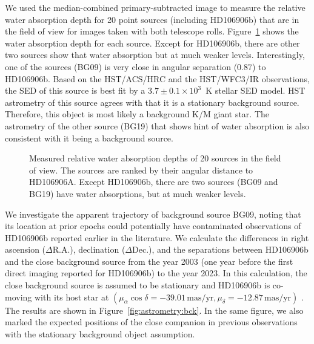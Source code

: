 \documentclass[twocolumn]{aastex62}
\begin{document}
We used the median-combined primary-subtracted image to measure the relative water absorption depth for 20 point sources (including HD106906b) that are in the field of view for images taken with both telescope rolls. Figure~\ref{fig:backgroundsources} shows the water absorption depth for each source. Except for HD106906b, there are other two sources show that water absorption but at much weaker levels. Interestingly, one of the sources (BG09) {is very close in angular separation} (0.87\arcsec) to HD106906b.  Based on the HST/ACS/HRC and the HST/WFC3/IR observations, the SED of this source is best fit by a $3.7\pm0.1\times10^{3}$~K stellar SED model. HST astrometry of this source agrees with  that it is a stationary background source. Therefore, this object is most likely a background K/M giant star. The astrometry of the other source (BG19) that shows hint of water absorption is also consistent with it being a background source.

\begin{figure}
  \centering
  \caption{Measured relative water absorption depths of 20 sources in the field of view. The sources are ranked by their angular distance to HD106906A. Except HD106906b, there are two sources (BG09 and BG19) have water absorptions, but at much weaker levels.}
  \label{fig:backgroundsources}
\end{figure}

We investigate the {apparent trajectory} of background source BG09, {noting that its location at prior epochs could potentially have contaminated observations of HD106906b reported earlier in the literature}.  We calculate  the differences in right ascension ($\Delta${R.A.}),  declination ($\Delta${Dec.}), and the separations between HD106906b and the close background source from the year 2003 (one year before the first direct imaging {reported for} HD106906b) to the year 2023. In this calculation, the close background source is assumed to be stationary and HD106906b is co-moving with its host star at $(\mu_\alpha\cos\delta=-39.01\,\mbox{mas/yr}, \mu_{\delta}=-12.87\,\mbox{mas/yr})$ \citep{Gaia2016, Gaia2018}. The results are shown in Figure~\ref{fig:astrometry:bck}. In the same figure, we also marked the expected positions of the close companion in previous observations \citep{Bailey2013, Wu2016, Lagrange2016, Daemgen2017} with the stationary background object assumption.
\end{document}
